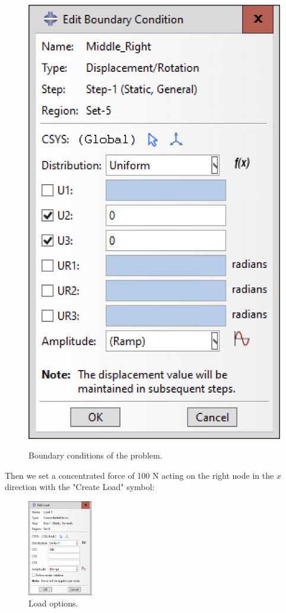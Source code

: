 \begin{figure}[H]
{        \includegraphics[scale=0.4]{Images/ab1/a17.png}
    }
    \caption{Boundary conditions of the problem.}
    \label{fig:a14151617}
\end{figure}

Then we set a concentrated force of 100 N acting on the right node in the $x$ direction with the "Create Load" symbol:
\begin{figure}[H]
    \centering
    \includegraphics[width=0.25\textwidth]{Images/ab1/a20.png}
    \caption{Load options.}
    \label{fig:a20}
\end{figure}

